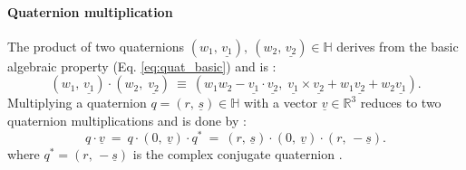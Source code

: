 \paragraph{Quaternion multiplication}
The product of two quaternions $\left( w_1,\,\underline{v_1} \right),\ \left( w_2,\,\underline{v_2} \right) \in \mathbb{H}$ 
derives from the basic algebraic property (Eq. \ref{eq:quat_basic}) and is \cite[pp. 106-110]{Kuipers2002}:
\begin{equation}
	\left( w_1, \,\underline{v_1} \right) \cdot \left( w_2, \;\underline{v_2} \right) \ \equiv \ 
	\left( w_1 w_2 - \underline{v_1} \cdot \underline{v_2}, \;\underline{v_1} \times \underline{v_2} + w_1 \underline{v_2} + w_2 \underline{v_1}\right).
\end{equation}
Multiplying a quaternion $q = \left( r,\, \underline{s} \right) \in \mathbb{H}$ with a vector 
$\underline{v} \in \mathbb{R}^3$  reduces to two quaternion multiplications and is done by \cite[p. 127]{Kuipers2002}:
\begin{equation}
	q \cdot \underline{v} \ =\ 
	q \cdot \left(0,\ \underline{v} \right) \cdot q^{*} \ =\ 
	\left( r,\, \underline{s} \right) \cdot \left(0,\ \underline{v} \right) \cdot \left( r,\, -\underline{s} \right).
	\label{eq:mult_quat_vec}
\end{equation}
where $q^{*} = \left( r,\, -\underline{s} \right)$ is the complex conjugate quaternion \cite[pp. 110-111]{Kuipers2002}.

